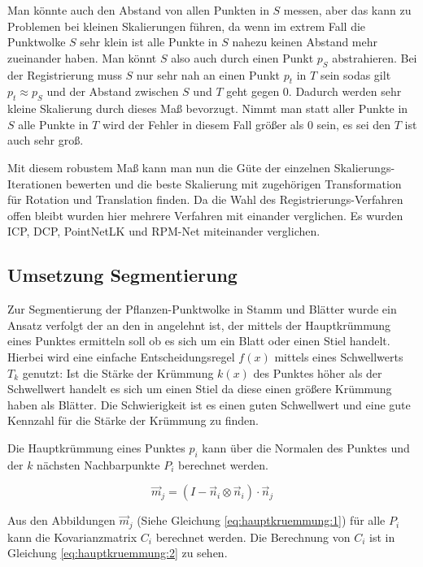 \documentclass[12pt,titlepage, twoside]{article}
\begin{document}
Man könnte auch den Abstand von allen Punkten in $S$ messen, aber das kann zu Problemen bei kleinen Skalierungen führen, da wenn im extrem Fall die Punktwolke $S$ sehr klein ist alle Punkte in $S$ nahezu keinen Abstand mehr zueinander haben.
Man könnt $S$ also auch durch einen Punkt $p_{S}$ abstrahieren.
Bei der Registrierung muss $S$ nur sehr nah an einen Punkt $p_t$ in $T$ sein sodas gilt $p_t \approx p_S$ und der Abstand zwischen $S$ und $T$ geht gegen $0$. Dadurch werden sehr kleine Skalierung durch dieses Maß bevorzugt.
Nimmt man statt aller Punkte in $S$ alle Punkte in $T$ wird der Fehler in diesem Fall größer als 0 sein, es sei den $T$ ist auch sehr groß.

Mit diesem robustem Maß kann man nun die Güte der einzelnen Skalierungs-Iterationen bewerten und die beste Skalierung mit zugehörigen Transformation für Rotation und Translation finden.
Da die Wahl des Registrierungs-Verfahren offen bleibt wurden hier mehrere Verfahren mit einander verglichen. Es wurden ICP, DCP, PointNetLK und RPM-Net miteinander verglichen.

\subsection{Umsetzung Segmentierung}
\label{sec:realisierung:implementierung3}

Zur Segmentierung der Pflanzen-Punktwolke in Stamm und Blätter wurde ein Ansatz verfolgt der an den in \cite{ThreeBasics} angelehnt ist, der mittels der Hauptkrümmung eines Punktes ermitteln soll ob es sich um ein Blatt oder einen Stiel handelt. 
Hierbei wird eine einfache Entscheidungsregel $f(x)$ mittels eines Schwellwerts $T_k$ genutzt: Ist die Stärke der Krümmung $k(x)$ des Punktes höher als der Schwellwert handelt es sich um einen Stiel da diese einen größere Krümmung haben als Blätter.
Die Schwierigkeit ist es einen guten Schwellwert und eine gute Kennzahl für die Stärke der Krümmung zu finden.

Die Hauptkrümmung eines Punktes $p_i$ kann über die Normalen des Punktes und der $k$ nächsten Nachbarpunkte $P_i$ berechnet werden.

\begin{equation}
\label{eq:hauptkruemmung:1}
\vec{m}_j = (I - \vec{n}_i \otimes \vec{n}_i ) \cdot \vec{n}_j
\end{equation}

Aus den Abbildungen $\vec{m}_j$ (Siehe Gleichung \ref{eq:hauptkruemmung:1}) für alle $P_i$ kann die Kovarianzmatrix $C_i$ berechnet werden. Die Berechnung von $C_i$ ist in Gleichung \ref{eq:hauptkruemmung:2} zu sehen.
\end{document}
